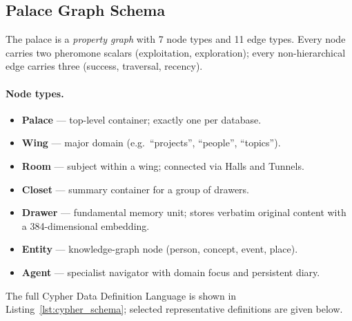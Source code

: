 \documentclass[11pt,a4paper]{article}
\begin{document}
\subsection{Palace Graph Schema}
\label{sec:schema}

The palace is a \emph{property graph} with 7 node types and 11 edge types.
Every node carries two pheromone scalars (exploitation, exploration); every
non-hierarchical edge carries three (success, traversal, recency).

\paragraph{Node types.}
\begin{itemize}[nosep]
\item \textbf{Palace} --- top-level container; exactly one per database.
\item \textbf{Wing} --- major domain (e.g.\ ``projects'', ``people'', ``topics'').
\item \textbf{Room} --- subject within a wing; connected via Halls and Tunnels.
\item \textbf{Closet} --- summary container for a group of drawers.
\item \textbf{Drawer} --- fundamental memory unit; stores verbatim original
      content with a 384-dimensional embedding.
\item \textbf{Entity} --- knowledge-graph node (person, concept, event, place).
\item \textbf{Agent} --- specialist navigator with domain focus and persistent
      diary.
\end{itemize}

The full Cypher Data Definition Language is shown in
Listing~\ref{lst:cypher_schema}; selected representative definitions are given
below.
\end{document}
